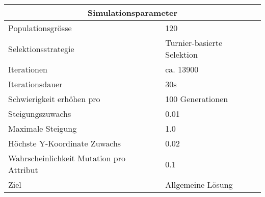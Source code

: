 
    \begin{tabular}{ | l | l | }
      \hline
      \multicolumn{2}{|c|}{Simulationsparameter} \\
      \hline
      Populationsgrösse & 120 \\ \hline
      Selektionsstrategie & Turnier-basierte Selektion \\ \hline
      Iterationen & ca. 13900 \\ \hline
      Iterationsdauer & 30s \\ \hline
      Schwierigkeit erhöhen pro & 100 Generationen \\ \hline
      Steigungszuwachs & 0.01 \\ \hline
      Maximale Steigung & 1.0 \\ \hline
      Höchste Y-Koordinate Zuwachs  & 0.02 \\ \hline
      Wahrscheinlichkeit Mutation pro Attribut & 0.1 \\ \hline
      Ziel & Allgemeine Lösung \\ \hline
    \end{tabular}
